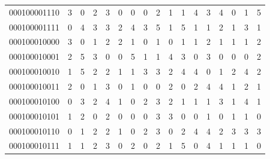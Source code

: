\documentclass[10pt,a4paper]{article}
\begin{document}
\begin{longtable}{ |c|c|c|c|c|c|c|c|c|c|c|c|c|c|c|c|c| }
    000100001110              & 3                            & 0                                & 2                            & 3                              & 0   & 0   & 0   & 2   & 1   & 1   & 4   & 3   & 4   & 0   & 1   & 5   \\
    000100001111              & 0                            & 4                                & 3                            & 3                              & 2   & 4   & 3   & 5   & 1   & 5   & 1   & 1   & 2   & 1   & 3   & 1   \\
    000100010000              & 3                            & 0                                & 1                            & 2                              & 2   & 1   & 0   & 1   & 0   & 1   & 1   & 2   & 1   & 1   & 1   & 2   \\
    000100010001              & 2                            & 5                                & 3                            & 0                              & 0   & 5   & 1   & 1   & 4   & 3   & 0   & 3   & 0   & 0   & 0   & 2   \\
    000100010010              & 1                            & 5                                & 2                            & 2                              & 1   & 1   & 3   & 3   & 2   & 4   & 4   & 0   & 1   & 2   & 4   & 2   \\
    000100010011              & 2                            & 0                                & 1                            & 3                              & 0   & 1   & 0   & 0   & 2   & 0   & 2   & 4   & 4   & 1   & 2   & 1   \\
    000100010100              & 0                            & 3                                & 2                            & 4                              & 1   & 0   & 2   & 3   & 2   & 1   & 1   & 1   & 3   & 1   & 4   & 1   \\
    000100010101              & 1                            & 2                                & 0                            & 2                              & 0   & 0   & 0   & 3   & 3   & 0   & 0   & 1   & 0   & 1   & 1   & 0   \\
    000100010110              & 0                            & 1                                & 2                            & 2                              & 1   & 0   & 2   & 3   & 0   & 2   & 4   & 4   & 2   & 3   & 3   & 3   \\
    000100010111              & 1                            & 1                                & 2                            & 3                              & 0   & 2   & 0   & 2   & 1   & 5   & 0   & 4   & 1   & 1   & 1   & 0   \\

\end{longtable}
\end{document}

